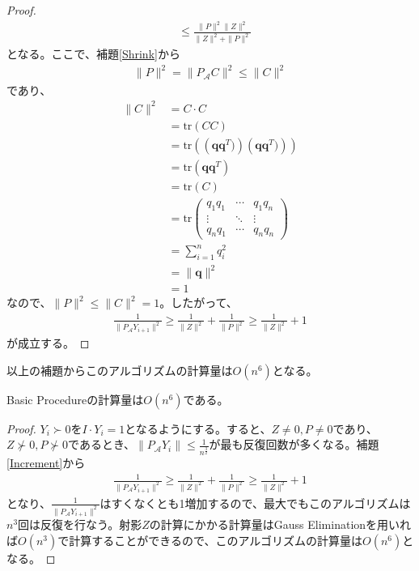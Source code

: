 \begin{proof}
\begin{align*}
                                  & \leq \frac{\|P\|^2 \|Z\|^2}{\|Z\|^2 + \|P\|^2}
  \end{align*}
  となる。ここで、補題\ref{Shrink}から
  \begin{align*}
    \|P\|^2 = \|P_\mathcal{A} C\|^2 \leq \|C\|^2
  \end{align*}
  であり、
  \begin{align*}
    \|C\|^2 & = C \cdot C \\
            & = \mathrm{tr} \left(C C\right) \\
            & = \mathrm{tr} \left(\left(\mathbf{q} \mathbf{q}^T)\right) \left(\mathbf{q} \mathbf{q}^T)\right)\right) \\
            & = \mathrm{tr} \left(\mathbf{q} \mathbf{q}^T\right) \\
            & = \mathrm{tr} \left(C\right) \\
            & = \mathrm{tr} \left(
                              \begin{array}{ccc}
                                q_1 q_1 & \cdots & q_1 q_n \\
                                \vdots  & \ddots & \vdots \\
                                q_n q_1 & \cdots & q_n q_n
                              \end{array}
                            \right) \\
            & = \displaystyle{\sum_{i = 1}^n} q_i^2 \\
            & = \|\mathbf{q}\|^2 \\
            & = 1
  \end{align*}
  なので、$\|P\|^2 \leq \|C\|^2 = 1$。したがって、
  \begin{align*}
    \frac{1}{\|P_\mathcal{A} Y_{i + 1}\|^2} \geq \frac{1}{\|Z\|^2} + \frac{1}{\|P\|^2} \geq \frac{1}{\|Z\|^2} + 1
  \end{align*}
  が成立する。
\end{proof}

以上の補題からこのアルゴリズムの計算量は$O(n^6)$となる。
\begin{theorem} \label{BasicProcedureOrder}
  Basic Procedureの計算量は$O (n^6)$である。
\end{theorem}
\begin{proof}
  $Y_i \succ 0$を$I \cdot Y_i = 1$となるようにする。すると、$Z \not= 0, P \not= 0$であり、$Z \not\succ 0, P \not\succ 0$であるとき、$\|P_\mathcal{A} Y_i\| \leq \displaystyle{\frac{1}{n^\frac{3}{2}}}$が最も反復回数が多くなる。補題\ref{Increment}から
  \begin{align*}
    \frac{1}{\|P_\mathcal{A} Y_{i + 1}\|^2} \geq \frac{1}{\|Z\|^2} + \frac{1}{\|P\|^2} \geq \frac{1}{\|Z\|^2} + 1
  \end{align*}
  となり、$\displaystyle{\frac{1}{\|P_\mathcal{A} Y_{i + 1}\|^2}}$はすくなくとも1増加するので、最大でもこのアルゴリズムは$n^3$回は反復を行なう。射影$Z$の計算にかかる計算量はGauss Eliminationを用いれば$O (n^3)$で計算することができるので、このアルゴリズムの計算量は$O(n^6)$となる。
\end{proof}

